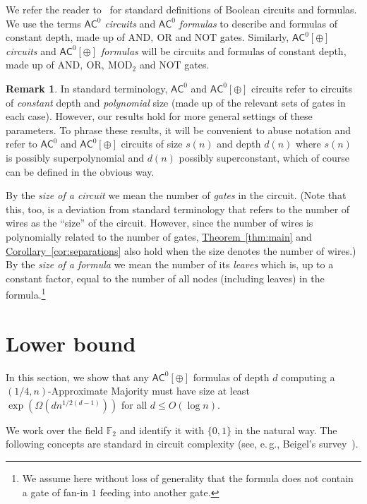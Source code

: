 \documentclass[11pt]{article}
\numberwithin{equation}{section}
\theoremstyle{definition}
\newtheorem{remark}[theorem]{Remark}
\theoremstyle{plain}
\newcommand{\cclass}[1]{\textsf{#1}}
\newcommand{\eg}{e.\,g.}
\newcommand{\expref}[2]{\hyperref[#2]{#1~\ref{#2}}}
\newcommand{\F}{\mathbb{F}}
\newcommand{\AC}{\cclass{AC}}
\begin{document}
We refer the reader to~\cite{AroraBarak, Jukna} for standard definitions of
Boolean circuits and formulas. We use
%
the terms  %
%
%
\emph{$\AC^0$ circuits} and \emph{$\AC^0$ formulas} to describe
%
%
and formulas %
of constant depth,   %
made up of
$\mathrm{AND},\ \mathrm{OR}$ and $\mathrm{NOT}$ gates. 
Similarly, %
\emph{$\AC^0[\oplus]$ circuits}
%
and %
%
\emph{$\AC^0[\oplus]$ formulas}
will be circuits
%
%
and formulas %
of constant depth,   %
made up of $\mathrm{AND},\ \mathrm{OR},\ \mathrm{MOD}_2$ 
and $\mathrm{NOT}$ gates.
%
%
\begin{remark}
%
%
%
%
In standard terminology, $\AC^0$ and $\AC^0[\oplus]$ circuits refer to circuits of \emph{constant} depth and \emph{polynomial} size (made up of the relevant sets of gates in each case). However, our results hold for more general settings of these parameters. To phrase these results, it will be convenient to abuse notation and refer to $\AC^0$ and $\AC^0[\oplus]$ circuits of size $s(n)$ and depth $d(n)$ where $s(n)$ is possibly superpolynomial and $d(n)$ possibly superconstant, which of course can be defined in the obvious way.
\end{remark}
%
%
%
%
%
By the \emph{size of a circuit} we mean the number of \emph{gates}
in the circuit.  (Note that this, too, is a deviation from standard
terminology that refers to the number of wires as the ``size'' of
%
%
the circuit. However, since the number of wires is polynomially related to the number of gates, \expref{Theorem}{thm:main} and \expref{Corollary}{cor:separations} also hold when the size denotes the number of wires.)
%
By the \emph{size of a formula} we mean the number of its \emph{leaves}
%
which is, %
up to a constant factor, equal to
%
the number of all nodes (including leaves)
in the formula.\footnote{We assume here without loss of generality
that the formula does not contain a gate of fan-in $1$ feeding into
%
another gate.}  %

%
\section{Lower bound}    %
\label{sec:lbd}

In this section, we show that any $\AC^0[\oplus]$ formulas of depth $d$
computing a $(1/4,n)$-Approximate Majority must have size at least
$\exp(\Omega(dn^{1/2(d-1)}))$ for all $d \le O(\log n)$. 

We work over the field $\F_2$ and identify it with $\{0,1\}$ in the
natural way. The following concepts are standard in circuit complexity
(see, \eg, Beigel's survey~\cite{Beigelpolysurvey}).
\end{document}
